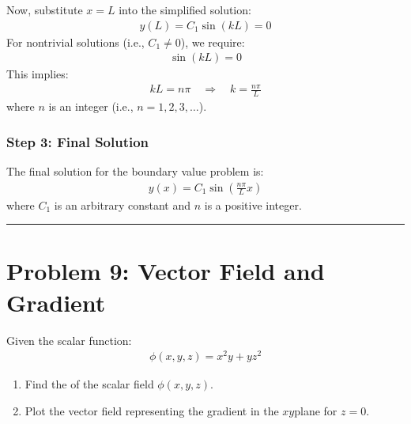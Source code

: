 \documentclass[letterpaper,10pt,english]{jupyterBook}
\begin{document}
\sphinxAtStartPar
Now, substitute \(x = L\) into the simplified solution:
\begin{equation*}
\begin{split}
y(L) = C_1 \sin(kL) = 0
\end{split}
\end{equation*}
\sphinxAtStartPar
For non\sphinxhyphen{}trivial solutions (i.e., \(C_1 \neq 0\)), we require:
\begin{equation*}
\begin{split}
\sin(kL) = 0
\end{split}
\end{equation*}
\sphinxAtStartPar
This implies:
\begin{equation*}
\begin{split}
kL = n\pi \quad \Rightarrow \quad k = \frac{n\pi}{L}
\end{split}
\end{equation*}
\sphinxAtStartPar
where \(n\) is an integer (i.e., \(n = 1, 2, 3, \dots\)).


\subsubsection{Step 3: Final Solution}
\label{\detokenize{prerequisites:step-3-final-solution}}
\sphinxAtStartPar
The final solution for the boundary value problem is:
\begin{equation*}
\begin{split}
y(x) = C_1 \sin\left( \frac{n\pi}{L} x \right)
\end{split}
\end{equation*}
\sphinxAtStartPar
where \(C_1\) is an arbitrary constant and \(n\) is a positive integer.


\bigskip\hrule\bigskip



\section{Problem 9: Vector Field and Gradient}
\label{\detokenize{prerequisites:problem-9-vector-field-and-gradient}}
\sphinxAtStartPar
Given the scalar function:
\begin{equation*}
\begin{split}
\phi(x, y, z) = x^2 y + yz^2
\end{split}
\end{equation*}\begin{enumerate}
%
\item {} 
\sphinxAtStartPar
Find the  of the scalar field \(\phi(x, y, z)\).

\item {} 
\sphinxAtStartPar
Plot the vector field representing the gradient in the \(xy\)\sphinxhyphen{}plane for \(z = 0\).

\end{enumerate}
\end{document}

